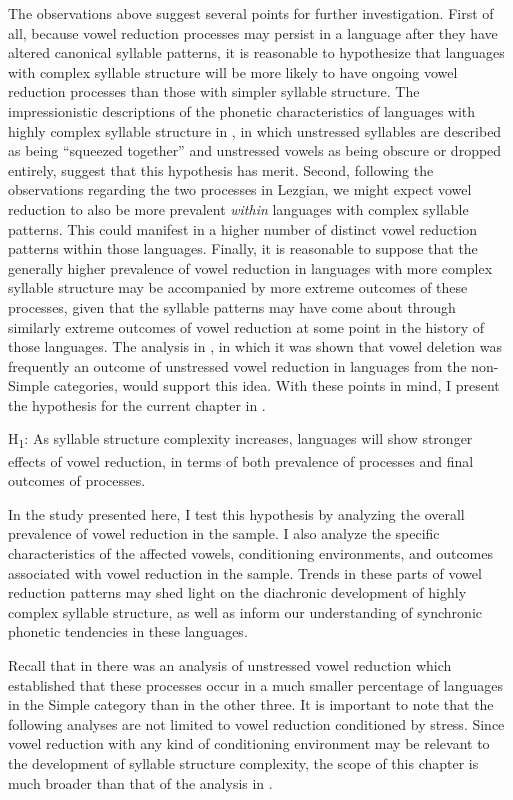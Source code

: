   The observations above suggest several points for further investigation. First of all, because vowel reduction processes may persist in a language after they have altered canonical syllable patterns, it is reasonable to hypothesize that languages with complex syllable structure will be more likely to have ongoing vowel reduction processes than those with simpler syllable structure. The impressionistic descriptions of the phonetic characteristics of languages with highly complex syllable structure in , in which unstressed syllables are described as being “squeezed together” and unstressed vowels as being obscure or dropped entirely, suggest that this hypothesis has merit. Second, following the observations regarding the two processes in Lezgian, we might expect vowel reduction to also be more prevalent \textit{within} languages with complex syllable patterns. This could manifest in a higher number of distinct vowel reduction patterns within those languages. Finally, it is reasonable to suppose that the generally higher prevalence of vowel reduction in languages with more complex syllable structure may be accompanied by more extreme outcomes of these processes, given that the syllable patterns may have come about through similarly extreme outcomes of vowel reduction at some point in the history of those languages. The analysis in , in which it was shown that vowel deletion was frequently an outcome of unstressed vowel reduction in languages from the non-Simple categories, would support this idea. With these points in mind, I present the hypothesis for the current chapter in .

\ea\label{ex:6.3}
   H\textsubscript{1}:  As syllable structure complexity increases, languages will show stronger effects of vowel reduction, in terms of both prevalence of processes and final outcomes of processes.
\z

  In the study presented here, I test this hypothesis by analyzing the overall prevalence of vowel reduction in the sample. I also analyze the specific characteristics of the affected vowels, conditioning environments, and outcomes associated with vowel reduction in the sample. Trends in these parts of vowel reduction patterns may shed light on the diachronic development of highly complex syllable structure, as well as inform our understanding of synchronic phonetic tendencies in these languages.

  Recall that in  there was an analysis of unstressed vowel reduction which established that these processes occur in a much smaller percentage of languages in the Simple category than in the other three. It is important to note that the following analyses are not limited to vowel reduction conditioned by stress. Since vowel reduction with any kind of conditioning environment may be relevant to the development of syllable structure complexity, the scope of this chapter is much broader than that of the analysis in .

